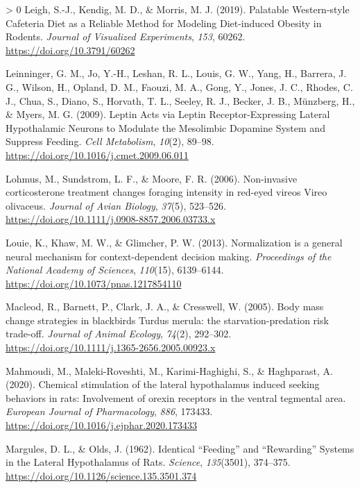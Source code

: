 \documentclass[
]{/home/nicoluarte/Downloads/templates/PNAS-template-main.tex}
\newlength{\cslhangindent}
\newenvironment{CSLReferences}[3] %
 {%
  \setlength{\parindent}{0pt}
  \ifodd #1 \everypar{\setlength{\hangindent}{\cslhangindent}}\ignorespaces\fi
  \ifnum #2 > 0
  \setlength{\parskip}{#2\baselineskip}
  \fi
 }%
 {}
\begin{document}
\begin{CSLReferences}{1}{0}
\leavevmode\hypertarget{ref-EBJDV6NP}{}%
Leigh, S.-J., Kendig, M. D., \& Morris, M. J. (2019). Palatable
Western-style Cafeteria Diet as a Reliable Method for Modeling
Diet-induced Obesity in Rodents. \emph{Journal of Visualized
Experiments}, \emph{153}, 60262. \url{https://doi.org/10.3791/60262}

\leavevmode\hypertarget{ref-GDVXZGJY}{}%
Leinninger, G. M., Jo, Y.-H., Leshan, R. L., Louis, G. W., Yang, H.,
Barrera, J. G., Wilson, H., Opland, D. M., Faouzi, M. A., Gong, Y.,
Jones, J. C., Rhodes, C. J., Chua, S., Diano, S., Horvath, T. L.,
Seeley, R. J., Becker, J. B., Münzberg, H., \& Myers, M. G. (2009).
Leptin Acts via Leptin Receptor-Expressing Lateral Hypothalamic Neurons
to Modulate the Mesolimbic Dopamine System and Suppress Feeding.
\emph{Cell Metabolism}, \emph{10}(2), 89--98.
\url{https://doi.org/10.1016/j.cmet.2009.06.011}

\leavevmode\hypertarget{ref-8RIQXAVT}{}%
Lohmus, M., Sundstrom, L. F., \& Moore, F. R. (2006). Non-invasive
corticosterone treatment changes foraging intensity in red-eyed vireos
Vireo olivaceus. \emph{Journal of Avian Biology}, \emph{37}(5),
523--526. \url{https://doi.org/10.1111/j.0908-8857.2006.03733.x}

\leavevmode\hypertarget{ref-S8GZWPNK}{}%
Louie, K., Khaw, M. W., \& Glimcher, P. W. (2013). Normalization is a
general neural mechanism for context-dependent decision making.
\emph{Proceedings of the National Academy of Sciences}, \emph{110}(15),
6139--6144. \url{https://doi.org/10.1073/pnas.1217854110}

\leavevmode\hypertarget{ref-8XA5RHVI}{}%
Macleod, R., Barnett, P., Clark, J. A., \& Cresswell, W. (2005). Body
mass change strategies in blackbirds Turdus merula: the
starvation-predation risk trade-off. \emph{Journal of Animal Ecology},
\emph{74}(2), 292--302.
\url{https://doi.org/10.1111/j.1365-2656.2005.00923.x}

\leavevmode\hypertarget{ref-YMQYAEQ8}{}%
Mahmoudi, M., Maleki-Roveshti, M., Karimi-Haghighi, S., \& Haghparast,
A. (2020). Chemical stimulation of the lateral hypothalamus induced
seeking behaviors in rats: Involvement of orexin receptors in the
ventral tegmental area. \emph{European Journal of Pharmacology},
\emph{886}, 173433. \url{https://doi.org/10.1016/j.ejphar.2020.173433}

\leavevmode\hypertarget{ref-MW2YHV9D}{}%
Margules, D. L., \& Olds, J. (1962). Identical {``Feeding''} and
{``Rewarding''} Systems in the Lateral Hypothalamus of Rats.
\emph{Science}, \emph{135}(3501), 374--375.
\url{https://doi.org/10.1126/science.135.3501.374}


\end{CSLReferences}
\end{document}
